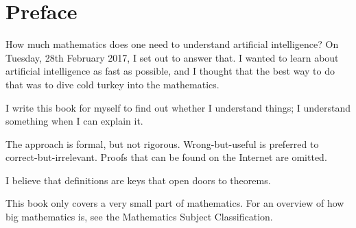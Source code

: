 \chapter*{Preface}

How much mathematics does one need to understand artificial intelligence?
On Tuesday, 28th February 2017, I set out to answer that.
I wanted to learn about artificial intelligence as fast as possible,
and I thought that the best way to do that was to dive cold turkey into the mathematics.

I write this book for myself
to find out whether I understand things;
I understand something when I can explain it.

The approach is formal, but not rigorous.
Wrong-but-useful is preferred to correct-but-irrelevant.
Proofs that can be found on the Internet are omitted.

I believe that definitions
are keys that open doors to theorems.

This book only covers a very small part of mathematics.
For an overview of how big mathematics is,
see the Mathematics Subject Classification.
